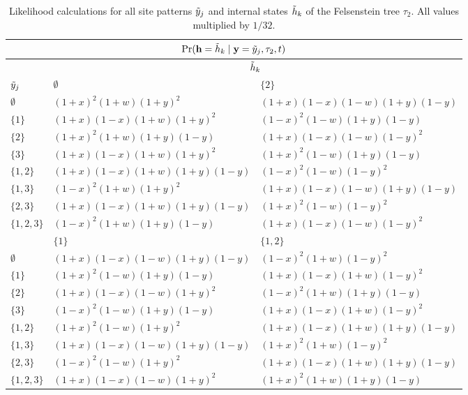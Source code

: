\begin{table}
\centering
\begin{tabular}{|l|ll|}
\multicolumn{3}{c}{$\Pr(\mathbf{h}=\tilde{h}_k\mid \mathbf{y}=\tilde{y}_j,\tau_2,t)$}\\
\hline
& \multicolumn{2}{|c|}{$\tilde{h}_k$}\\
    \hline
    $\tilde{y}_j$    &$\emptyset$                                &$\{2\}$  \\
    \hline
     $\emptyset$   &$(1+x)^2   (1+w)(1+y)^2$           &$(1+x)(1-x)(1-w)(1+y)(1-y)$\\
     $\{1\}$       &$(1+x)(1-x)(1+w)(1+y)^2$           &$(1-x)^2   (1-w)(1+y)(1-y)$\\
     $\{2\}$       &$(1+x)^2   (1+w)(1+y)(1-y)$        &$(1+x)(1-x)(1-w)(1-y)^2$\\
     $\{3\}$       &$(1+x)(1-x)(1+w)(1+y)^2$           &$(1+x)^2   (1-w)(1+y)(1-y)$\\
     $\{1,2\}$     &$(1+x)(1-x)(1+w)(1+y)(1-y)$        &$(1-x)^2   (1-w)(1-y)^2$\\
     $\{1,3\}$     &$(1-x)^2   (1+w)(1+y)^2$           &$(1+x)(1-x)(1-w)(1+y)(1-y)$\\
     $\{2,3\}$     &$(1+x)(1-x)(1+w)(1+y)(1-y)$        &$(1+x)^2   (1-w)(1-y)^2$\\
     $\{1,2,3\}$   &$(1-x)^2   (1+w)(1+y)(1-y)$        &$(1+x)(1-x)(1-w)(1-y)^2$\\
    \hline
    \hline
    &$\{1\}$                             &$\{1,2\}$  \\
    \hline
     $\emptyset$   &$(1+x)(1-x)(1-w)(1+y)(1-y)$        &$(1-x)^2   (1+w)(1-y)^2$\\
     $\{1\}$       &$(1+x)^2   (1-w)(1+y)(1-y)$        &$(1+x)(1-x)(1+w)(1-y)^2$\\
     $\{2\}$       &$(1+x)(1-x)(1-w)(1+y)^2$           &$(1-x)^2   (1+w)(1+y)(1-y)$\\
     $\{3\}$       &$(1-x)^2   (1-w)(1+y)(1-y)$        &$(1+x)(1-x)(1+w)(1-y)^2$\\
     $\{1,2\}$     &$(1+x)^2   (1-w)(1+y)^2$           &$(1+x)(1-x)(1+w)(1+y)(1-y)$\\
     $\{1,3\}$     &$(1+x)(1-x)(1-w)(1+y)(1-y)$        &$(1+x)^2   (1+w)(1-y)^2$\\
     $\{2,3\}$     &$(1-x)^2   (1-w)(1+y)^2$           &$(1+x)(1-x)(1+w)(1+y)(1-y)$\\
     $\{1,2,3\}$   &$(1+x)(1-x)(1-w)(1+y)^2$           &$(1+x)^2   (1+w)(1+y)(1-y)$\\
\hline
\end{tabular}
\caption{Likelihood calculations for all site patterns $\tilde{y}_j$ and internal states $\tilde{h}_k$ of the Felsenstein tree $\tau_2$.
All values multiplied by $1/32$.}
\label{tab:fels_likelihoods}
\end{table}

